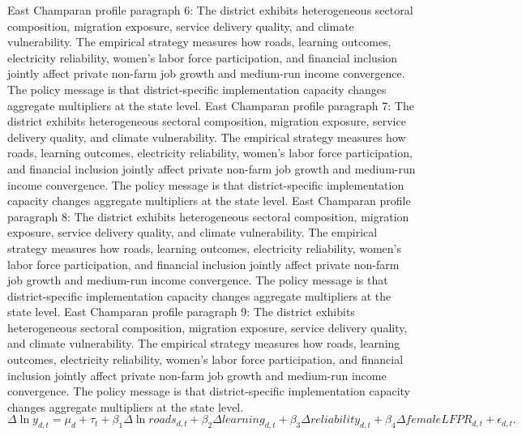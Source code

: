 \documentclass[preprint,12pt]{elsarticle}
\begin{document}
East Champaran profile paragraph 6: The district exhibits heterogeneous sectoral composition, migration exposure, service delivery quality, and climate vulnerability. The empirical strategy measures how roads, learning outcomes, electricity reliability, women's labor force participation, and financial inclusion jointly affect private non-farm job growth and medium-run income convergence. The policy message is that district-specific implementation capacity changes aggregate multipliers at the state level.
East Champaran profile paragraph 7: The district exhibits heterogeneous sectoral composition, migration exposure, service delivery quality, and climate vulnerability. The empirical strategy measures how roads, learning outcomes, electricity reliability, women's labor force participation, and financial inclusion jointly affect private non-farm job growth and medium-run income convergence. The policy message is that district-specific implementation capacity changes aggregate multipliers at the state level.
East Champaran profile paragraph 8: The district exhibits heterogeneous sectoral composition, migration exposure, service delivery quality, and climate vulnerability. The empirical strategy measures how roads, learning outcomes, electricity reliability, women's labor force participation, and financial inclusion jointly affect private non-farm job growth and medium-run income convergence. The policy message is that district-specific implementation capacity changes aggregate multipliers at the state level.
East Champaran profile paragraph 9: The district exhibits heterogeneous sectoral composition, migration exposure, service delivery quality, and climate vulnerability. The empirical strategy measures how roads, learning outcomes, electricity reliability, women's labor force participation, and financial inclusion jointly affect private non-farm job growth and medium-run income convergence. The policy message is that district-specific implementation capacity changes aggregate multipliers at the state level.
\begin{equation}\Delta \ln y_{d,t}=\mu_d+\tau_t+\beta_1\Delta\ln roads_{d,t}+\beta_2\Delta learning_{d,t}+\beta_3\Delta reliability_{d,t}+\beta_4\Delta femaleLFPR_{d,t}+\epsilon_{d,t}.\end{equation}
\end{document}
